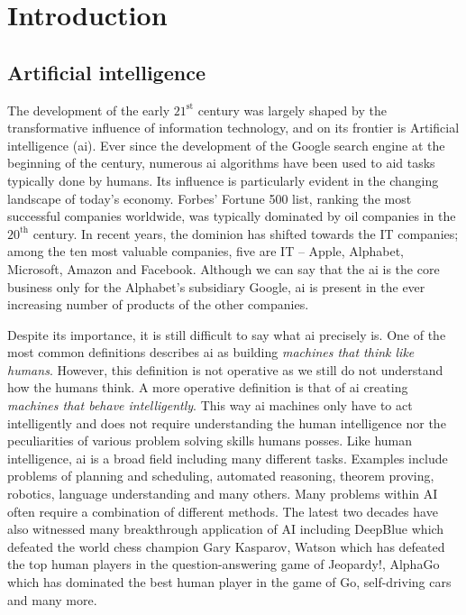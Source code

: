 \chapter{Introduction}\label{ch:introduction}


\section{Artificial intelligence}


The development of the early $21^{\text{st}}$ century was largely shaped by the transformative influence of information technology, and on its frontier is  Artificial intelligence (\gls{ai}).
Ever since the development of the Google search engine at the beginning of the century, numerous \gls{ai} algorithms have been used to aid tasks typically done by humans.
Its influence is particularly evident in the changing landscape of today's economy.
Forbes' Fortune 500 list, ranking the most successful companies worldwide, was typically dominated by oil companies in the $20^{\text{th}}$ century.
In recent years, the dominion has shifted towards the IT companies; among the ten most valuable companies, five are IT -- Apple, Alphabet, Microsoft, Amazon and Facebook.
Although we can say that the \gls{ai} is the core business only for the Alphabet's subsidiary Google, \gls{ai} is present in the ever increasing number of products of the other companies.







Despite its importance, it is still difficult to say what \gls{ai} precisely is.
One of the most common definitions describes \gls{ai} as building \textit{machines that think like humans}.
However, this definition is not operative as we still do not understand how the humans think.
A more operative definition is that of \gls{ai} creating \textit{machines that behave intelligently}.
This  way \gls{ai} machines only have to act intelligently and does not require understanding the human intelligence nor the peculiarities of various problem solving skills humans posses.
Like human intelligence, \gls{ai} is a broad field including many different tasks.
Examples include problems of planning and scheduling, automated reasoning, theorem proving, robotics, language understanding and many others.
Many problems within AI often require a combination of different methods.
The latest two decades have also witnessed many breakthrough application of AI including DeepBlue \cite{Hsu:2002:BDB:601291}  which defeated the world chess champion Gary Kasparov, Watson \cite{journals/aim/FerrucciBCFGKLMNPSW10} which has defeated the top human players in the question-answering game of Jeopardy!, AlphaGo \cite{SilverHuangEtAl16nature,silver2017mastering} which has dominated the best human player in the game of Go, self-driving cars and many more.





